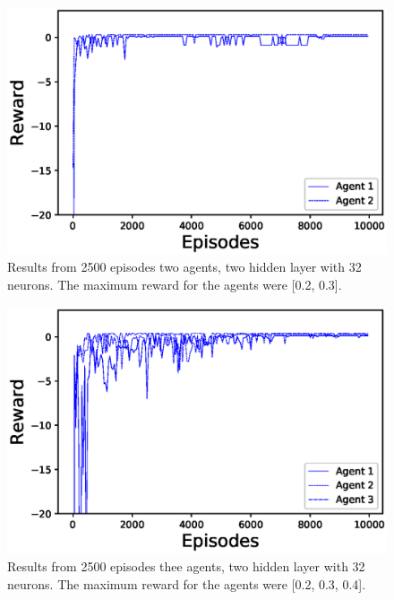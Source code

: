 \documentclass[journal,twoside]{IEEEtran}
\begin{document}
\begin{figure}[!h]
	\centering
	\includegraphics[width=\columnwidth]{2Agent_32n_2l_380000steps_250s}
	\caption{Results from 2500 episodes two agents, two hidden layer with 32 neurons. The maximum reward for the agents were [0.2, 0.3].}
	\label{2agent32n}    
\end{figure}

\begin{figure}[!h]
	\centering
	\includegraphics[width=\columnwidth]{3Agent_32n_2l_737343}
	\caption{Results from 2500 episodes thee agents, two hidden layer with 32 neurons. The maximum reward for the agents were [0.2, 0.3, 0.4].}
	\label{3agent32n}    
\end{figure}
\end{document}
